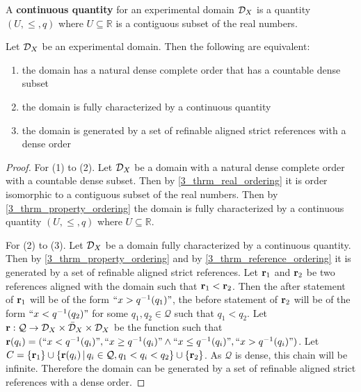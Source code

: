\documentclass[11pt,letterpaper,fleqn]{memoir} %
\begin{document}
\begin{mathSection}
	\begin{defn}
		A \textbf{continuous quantity} for an experimental domain $\mathcal{D}_X$ is a quantity $(U, \leq, q)$ where $U \subseteq \mathbb{R}$ is a contiguous subset of the real numbers.
	\end{defn}
\begin{thrm}\label{3_thrm_continuous_ordering}
	Let $\mathcal{D}_X$ be an experimental domain. Then the following are equivalent:
	\begin{enumerate}
		\item the domain has a natural dense complete order that has a countable dense subset
		\item the domain is fully characterized by a continuous quantity
		\item the domain is generated by a set of refinable aligned strict references with a dense order
	\end{enumerate}
\end{thrm}
\begin{proof}
	For (1) to (2). Let $\mathcal{D}_X$ be a domain with a natural dense complete order with a countable dense subset. Then by \ref{3_thrm_real_ordering} it is order isomorphic to a contiguous subset of the real numbers. Then by \ref{3_thrm_property_ordering} the domain is fully characterized by a continuous quantity $(U, \leq, q)$ where $U \subseteq \mathbb{R}$.
	
	For (2) to (3). Let $\mathcal{D}_X$ be a domain fully characterized by a continuous quantity. Then by \ref{3_thrm_property_ordering} and by \ref{3_thrm_reference_ordering} it is generated by a set of refinable aligned strict references.	Let $\textbf{r}_1$ and $\textbf{r}_2$ be two references aligned with the domain such that $\textbf{r}_1 < \textbf{r}_2$. Then the after statement of $\textbf{r}_1$ will be of the form $``x > q^{-1}(q_1)"$, the before statement of $\textbf{r}_2$ will be of the form $``x < q^{-1}(q_2)"$ for some $q_1, q_2 \in \mathcal{Q}$ such that $q_1 < q_2$. Let $\textbf{r} : \mathcal{Q} \to \mathcal{D}_X \times \bar{\mathcal{D}}_X \times \mathcal{D}_X$ be the function such that $\textbf{r}(q_i) = (``x < q^{-1}(q_i)", ``x \geq q^{-1}(q_i)" \wedge ``x \leq q^{-1}(q_i)", ``x > q^{-1}(q_i)")$. Let $C = \{\textbf{r}_1\} \cup \{\textbf{r}(q_i) \, | \, q_i \in \mathcal{Q}, q_1 < q_i < q_2  \} \cup \{ \textbf{r}_2 \}$. As $\mathcal{Q}$ is dense, this chain will be infinite. Therefore the domain can be generated by a set of refinable aligned strict references with a dense order.
	

\end{proof}
\end{mathSection}
\end{document}
